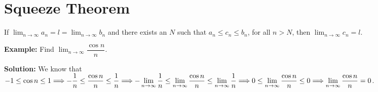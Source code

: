 \documentclass[titlepage,a4paper,12pt]{report}
\begin{document}
\section{Squeeze Theorem}
If $\displaystyle \lim _{n\rightarrow \infty} a_n=l=\lim _{n\rightarrow \infty}b_n$ and there exists an $N$ such that $a_n\leq c_n\leq b_n$, for all $n>N$, then $\displaystyle \lim _{n\rightarrow \infty}c_n=l$.

\noindent \textbf{Example:} Find $\displaystyle \lim _{n\rightarrow \infty} \dfrac{\cos n}{n}$.

\noindent \textbf{Solution:} We know that $-1\leq \cos n\leq 1\\
 \Longrightarrow -\dfrac{1}{n}\leq \dfrac{\cos n}{n}\leq \dfrac{1}{n}\Longrightarrow \displaystyle -\lim _{n\rightarrow \infty}\dfrac{1}{n}\leq \lim _{n\rightarrow \infty}\dfrac{\cos n}{n}\leq \lim _{n\rightarrow \infty}\dfrac{1}{n}\Longrightarrow 0\leq \displaystyle \lim _{n\rightarrow \infty}\dfrac{\cos n}{n} \leq 0\\
 \Longrightarrow \displaystyle \lim _{n\rightarrow \infty} \dfrac{\cos n}{n}=0$.
\end{document}
